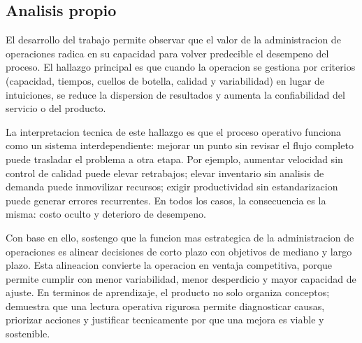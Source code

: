 \documentclass[
	spanish,
	letterpaper, oneside
]{article}
\begin{document}
%

\subsection{Analisis propio}

El desarrollo del trabajo permite observar que el valor de la administracion de operaciones radica en su capacidad para volver predecible el desempeno del proceso. El hallazgo principal es que cuando la operacion se gestiona por criterios (capacidad, tiempos, cuellos de botella, calidad y variabilidad) en lugar de intuiciones, se reduce la dispersion de resultados y aumenta la confiabilidad del servicio o del producto.

La interpretacion tecnica de este hallazgo es que el proceso operativo funciona como un sistema interdependiente: mejorar un punto sin revisar el flujo completo puede trasladar el problema a otra etapa. Por ejemplo, aumentar velocidad sin control de calidad puede elevar retrabajos; elevar inventario sin analisis de demanda puede inmovilizar recursos; exigir productividad sin estandarizacion puede generar errores recurrentes. En todos los casos, la consecuencia es la misma: costo oculto y deterioro de desempeno.

Con base en ello, sostengo que la funcion mas estrategica de la administracion de operaciones es alinear decisiones de corto plazo con objetivos de mediano y largo plazo. Esta alineacion convierte la operacion en ventaja competitiva, porque permite cumplir con menor variabilidad, menor desperdicio y mayor capacidad de ajuste. En terminos de aprendizaje, el producto no solo organiza conceptos; demuestra que una lectura operativa rigurosa permite diagnosticar causas, priorizar acciones y justificar tecnicamente por que una mejora es viable y sostenible.
\end{document}
